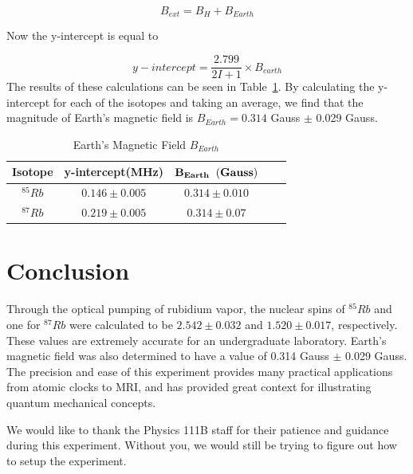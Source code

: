 \documentclass[%
 aip,
rsi,%
 amsmath,amssymb,
 reprint,%
author-numerical,%
]{revtex4-1}
\begin{document}
\begin{equation}
B _ { e x t } = B _ { H }+B_{Earth}
\label{eq:thirteen}
\end{equation}

\noindent Now the y-intercept is equal to 

\begin{equation}
y-intercept=\frac{2.799}{2I+1} \times B_{earth}
\label{eq:fourteen}
\end{equation}
\newline
The results of these calculations can be seen in Table~\ref{tab:table2}. By calculating the y-intercept for each of the isotopes and taking an average, we find that the magnitude of Earth's magnetic field is $B_{Earth}=0.314$ Gauss $\pm$ 0.029 Gauss.


\begin{table}[H]
\caption{\label{tab:table2}Earth's Magnetic Field  $B_{Earth}$ }
\begin{ruledtabular}
\begin{tabular}{ccccc}
\bf{Isotope} & \bf{y-intercept(MHz)} & $\bf{B}_{Earth}$ $\bf{(Gauss)}$\\ 
\hline
$^{85}Rb$  & $0.146\pm0.005$ & $0.314\pm0.010$ \\
\hline
$^{87}Rb$ &  $0.219\pm0.005$ & $0.314\pm0.07$  \\
\end{tabular}
\end{ruledtabular}
\end{table}

\section{Conclusion}
Through the optical pumping of rubidium vapor, the nuclear spins of $^{85}Rb$ and one for $^{87}Rb$ were calculated to be $2.542\pm0.032$ and $1.520\pm0.017$, respectively. These values are extremely accurate for an undergraduate laboratory. Earth's magnetic field was also determined to have a value of 0.314 Gauss $\pm$ 0.029 Gauss. The precision and ease of this experiment provides many practical applications from atomic clocks to MRI, and has provided great context for illustrating quantum mechanical concepts.


\begin{acknowledgments}
We would like to thank the Physics 111B staff for their patience and guidance during this experiment. Without you, we would still be trying to figure out how to setup the experiment. \newline

\end{acknowledgments}
\end{document}
